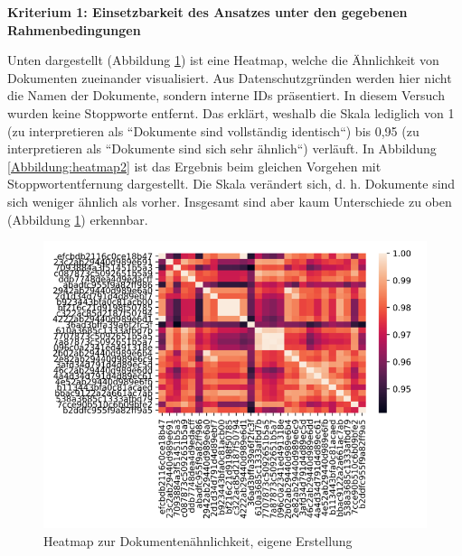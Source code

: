 {\bf Kriterium 1: Einsetzbarkeit des Ansatzes unter den gegebenen Rahmenbedingungen}

Unten dargestellt (Abbildung \ref{Abbildung:heatmap1}) ist eine Heatmap, welche die Ähnlichkeit von Dokumenten zueinander visualisiert. Aus Datenschutzgründen werden hier nicht die Namen der Dokumente, sondern interne IDs präsentiert. In diesem Versuch wurden keine Stoppworte entfernt. Das erklärt, weshalb die Skala lediglich von 1 (zu interpretieren als ``Dokumente sind vollständig identisch``) bis 0,95 (zu interpretieren als ``Dokumente sind sich sehr ähnlich``) verläuft. In Abbildung \ref{Abbildung:heatmap2} ist das Ergebnis beim gleichen Vorgehen mit Stoppwortentfernung dargestellt. Die Skala verändert sich, d. h. Dokumente sind sich weniger ähnlich als vorher. Insgesamt sind aber kaum Unterschiede zu oben (Abbildung \ref{Abbildung:heatmap1}) erkennbar. 
 
\begin{figure}[h]
\centering
\includegraphics[scale=0.95]{content/pics/Picture_12.png}
\caption{Heatmap zur Dokumentenähnlichkeit, eigene Erstellung}
\label{Abbildung:heatmap1}
\end{figure}

